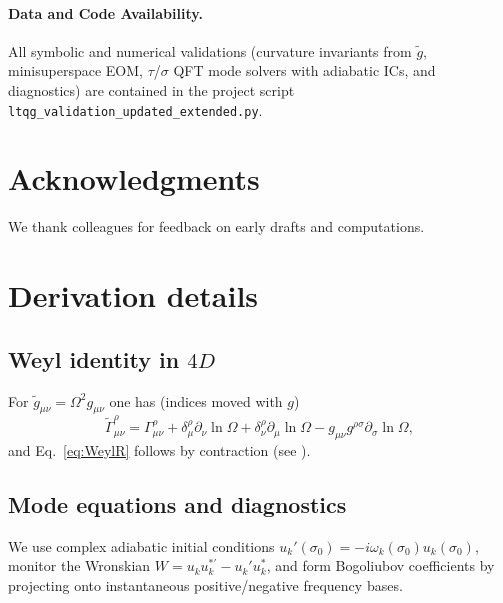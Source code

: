 \documentclass[11pt]{article}
\begin{document}
\paragraph{Data and Code Availability.}
All symbolic and numerical validations (curvature invariants from $\tilde g$, minisuperspace EOM, $\tau$/$\sigma$ QFT mode solvers with adiabatic ICs, and diagnostics) are contained in the project script \texttt{ltqg\_validation\_updated\_extended.py}.

\section*{Acknowledgments}
We thank colleagues for feedback on early drafts and computations.

\appendix
\section{Derivation details}
\subsection{Weyl identity in $4D$}
For $\tilde g_{\mu\nu}=\Omega^2 g_{\mu\nu}$ one has (indices moved with $g$)
\[
\tilde \Gamma^\rho_{\mu\nu}=\Gamma^\rho_{\mu\nu}+\delta^\rho_\mu \partial_\nu\ln\Omega + \delta^\rho_\nu \partial_\mu\ln\Omega - g_{\mu\nu} g^{\rho\sigma}\partial_\sigma\ln\Omega,
\]
and Eq.~\eqref{eq:WeylR} follows by contraction (see \cite{CarrollGR,WaldGR}).

\subsection{Mode equations and diagnostics}
We use complex adiabatic initial conditions \(u_k'(\sigma_0)=-i\omega_k(\sigma_0)u_k(\sigma_0)\), monitor the Wronskian \(W=u_k u_k^{\ast\prime}-u_k' u_k^\ast\), and form Bogoliubov coefficients by projecting onto instantaneous positive/negative frequency bases.
\end{document}
